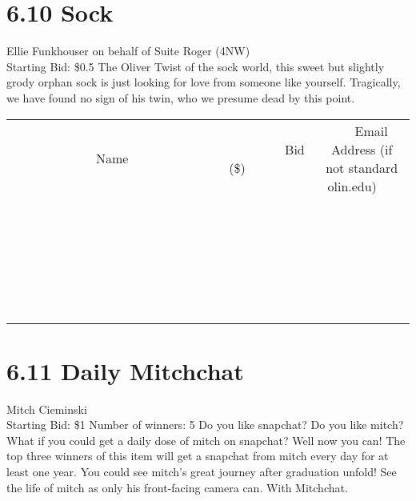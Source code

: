 \documentclass[11pt]{article}
\begin{document}
\section*{6.10 Sock}
Ellie Funkhouser on behalf of Suite Roger (4NW)
\\
Starting Bid: \$0.5
\newline
The Oliver Twist of the sock world, this sweet but slightly grody orphan sock is just looking for love from someone like yourself. Tragically, we have found no sign of his twin, who we presume dead by this point.
\\[6ex]
\begin{tabular}{c c c}
~~~~~~~~~~~~~Name~~~~~~~~~~~~~ & ~~~~~~~~~Bid (\$)~~~~~~~~~  & ~~~Email Address (if not standard olin.edu)~~~\\
 & & \\
\hline
 & & \\
\hline
 & & \\
\hline
 & & \\
\hline
 & & \\
\hline
 & & \\
\hline
 & & \\
\hline
 & & \\
\hline
 & & \\
\hline
 & & \\
\hline
 & & \\
\hline
 & & \\
\hline
 & & \\
\hline
 & & \\
\hline
 & & \\
\hline
 & & \\
\hline
 & & \\
\hline
 & & \\
\hline
 & & \\
\hline
 & & \\
\hline
 & & \\
\hline
 & & \\
\hline
 & & \\
\hline
 & & \\
\hline
 & & \\
\hline
 & & \\
\hline
\end{tabular}
\newpage
\section*{6.11 Daily Mitchchat}
Mitch Cieminski
\\
Starting Bid: \$1
\newline
Number of winners: 5
\newline
Do you like snapchat? Do you like mitch? What if you could get a daily dose of mitch on snapchat? Well now you can! The top three winners of this item will get a snapchat from mitch every day for at least one year. You could see mitch's great journey after graduation unfold! See the life of mitch as only his front-facing camera can. With Mitchchat.
\end{document}
